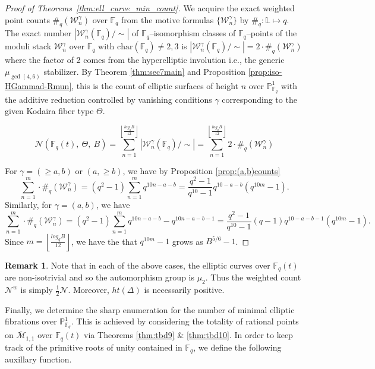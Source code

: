 \documentclass[a4paper,12pt]{amsart}
\theoremstyle{definition}
\newtheorem{rmk}[thm]{Remark}
\newcommand{\cW}{\mathcal{W}}
\newcommand{\Me}{\overline{\mathcal{M}}_{1,1}}
\newcommand{\Nc}{\mathcal{N}}
\newcommand{\Pb}{\mathbb{P}}
\newcommand{\Fb}{\mathbb{F}}
\newcommand{\Lb}{\mathbb{L}}
\begin{document}
	\begin{proof}[Proof of Theorems~\ref{thm:ell_curve_min_count}]
		
		
		We acquire the exact weighted point counts $\#_q\left(\cW_{n}^{\gamma}\right)$ over $\Fb_q$ from the motive formulas $\{\cW_{n}^{\gamma}\}$ by $\#_q: \Lb \mapsto q$. The exact number $|\cW_{n}^{\gamma}(\Fb_q)/\sim|$ of $\Fb_q$--isomorphism classes of $\Fb_q$--points of the moduli stack $\cW_{n}^{\gamma}$ over $\Fb_q$ with $\text{char} (\Fb_q) \neq 2,3$ is $|\cW_{n}^{\gamma}(\Fb_q)/\sim| = 2 \cdot \#_q\left(\cW_{n}^{\gamma}\right)$ where the factor of 2 comes from the hyperelliptic involution i.e., the generic $\mu_{\gcd(4,6)}$ stabilizer. By Theorem \ref{thm:sec7main} and Proposition \ref{prop:iso-HGammad-Rmun}, this is the count of elliptic surfaces of height $n$ over $\Pb^1_{\Fb_q}$ with the additive reduction controlled by vanishing conditions $\gamma$ corresponding to the given Kodaira fiber type $\Theta$. 
		
		\[ \Nc(\Fb_q(t),~\Theta,~B) = \sum \limits_{n=1}^{\left \lfloor \frac{log_q B}{12} \right \rfloor} |\cW_{n}^{\gamma}(\Fb_q)/\sim| = \sum \limits_{n=1}^{\left \lfloor \frac{log_q B}{12} \right \rfloor} 2 \cdot \#_q\left(\cW_{n}^{\gamma}\right) \]
		
		For $\gamma = (\geq a, b)$ or $(a, \geq b)$, we have by Proposition \ref{prop:(a,b)counts}
		$$
		\sum \limits_{n=1}^m \cdot \#_q\left(\cW_{n}^{\gamma}\right) = (q^2 - 1) \sum_{n = 1}^m q^{10n - a - b} = \frac{q^2 - 1}{q^{10}-1}q^{10 - a - b}(q^{10m}-1).
		$$
		Similarly, for $\gamma = (a,b)$, we have 
		$$
		\sum \limits_{n=1}^m \cdot \#_q\left(\cW_{n}^{\gamma}\right) = (q^2 - 1) \sum_{n = 1}^m q^{10n - a - b} - q^{10n - a - b - 1} = \frac{q^2 - 1}{q^{10}-1}(q-1)q^{10-a-b-1}(q^{10m}-1).
		$$
		Since $m = \left \lfloor \frac{log_q B}{12} \right \rfloor$, we have the that $q^{10m}-1$ grows as $B^{5/6} - 1$.
		
	\end{proof}
	
	\begin{rmk}
		Note that in each of the above cases, the elliptic curves over $\mathbb{F}_q(t)$ are non-isotrivial and so the automorphism group is $\mu_2$. Thus the weighted count $\Nc^w$ is simply $\frac{1}{2}\Nc$. Moreover, $ht(\Delta)$ is necessarily positive. 
	\end{rmk}
	
	
	
	
	
	
	Finally, we determine the sharp enumeration for the number of minimal elliptic fibrations over $\Pb^1_{\Fb_q}$. This is achieved by considering the totality of rational points on $\Me$ over $\Fb_q(t)$ via Theorems \ref{thm:tbd9} \& \ref{thm:tbd10}. In order to keep track of the primitive roots of unity contained in $\mathbb{F}_q$, we define the following auxillary function.
	
\end{document}

